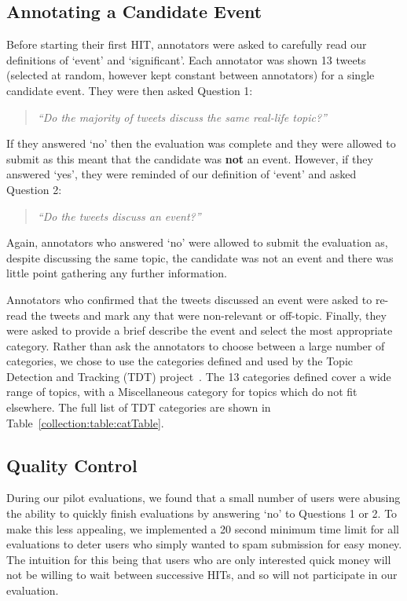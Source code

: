 \subsection{Annotating a Candidate Event}
\label{collection:sec:annotation}
Before starting their first HIT, annotators were asked to carefully read our definitions of `event' and `significant'.
Each annotator was shown 13 tweets (selected at random, however kept constant between annotators) for a single candidate event.
They were then asked Question 1:
\begin{quote}\emph{``Do the majority of tweets discuss the same real-life topic?''}
\end{quote}
If they answered `no' then the evaluation was complete and they were allowed to submit as this meant that the candidate was \textbf{not} an event.
However, if they answered `yes', they were reminded of our definition of `event' and asked Question 2:
\begin{quote}
\emph{``Do the tweets discuss an event?''}
\end{quote}
Again, annotators who answered `no' were allowed to submit the evaluation as, despite discussing the same topic, the candidate was not an event and there was little point gathering any further information.

Annotators who confirmed that the tweets discussed an event were asked to re-read the tweets and mark any that were non-relevant or off-topic.
Finally, they were asked to provide a brief describe the event and select the most appropriate category.
Rather than ask the annotators to choose between a large number of categories, we chose to use the categories defined and used by the Topic Detection and Tracking (TDT) project~\cite{Allan:2002:ITD:772260.772262}.
The 13 categories defined cover a wide range of topics, with a Miscellaneous category for topics which do not fit elsewhere.
The full list of TDT categories are shown in Table~\ref{collection:table:catTable}.

\subsection{Quality Control}
\label{sec:spam}
During our pilot evaluations, we found that a small number of users were abusing the ability to quickly finish evaluations by answering `no' to Questions 1 or 2.
To make this less appealing, we implemented a 20 second minimum time limit for all evaluations to deter users who simply wanted to spam submission for easy money.
The intuition for this being that users who are only interested quick money will not be willing to wait between successive HITs, and so will not participate in our evaluation.

